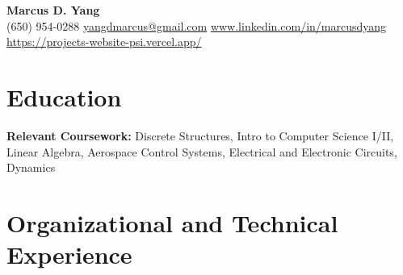 \newcommand{\entrygap}{\vspace{2pt}}



\begin{center}
  {\fontsize{17}{20}\selectfont\bfseries Marcus D. Yang}\\[2pt]
  {\footnotesize (650) 954-0288 \textbar{} \href{mailto:yangdmarcus@gmail.com}{yangdmarcus@gmail.com} \textbar{} \href{https://www.linkedin.com/in/marcusdyang}{www.linkedin.com/in/marcusdyang} \textbar{} \href{https://projects-website-psi.vercel.app/}{https://projects-website-psi.vercel.app/}}
\end{center}

\section{Education}
\textbf{Relevant Coursework:} Discrete Structures, Intro to Computer Science I/II, Linear Algebra, Aerospace Control Systems, Electrical and Electronic Circuits, Dynamics

\section{Organizational and Technical Experience}

